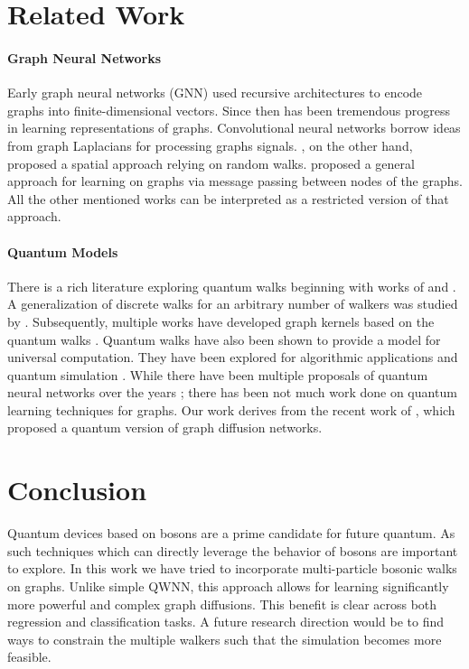 \documentclass{article}
\begin{document}
\section{Related Work}

\paragraph{Graph Neural Networks}
Early graph neural networks (GNN) \citep{gori2005new, scarselli2008graph} used recursive architectures to encode graphs into finite-dimensional vectors. Since then has been tremendous progress in learning representations of graphs. Convolutional neural networks \citep{bruna2013spectral, Defferrard2016ConvolutionalNN, Kipf2017SemiSupervisedCW} borrow ideas from graph Laplacians \citep{cvetkovic1998spectra} for processing graphs signals.  \citet{Atwood2016DiffusionConvolutionalNN}, on the other hand, proposed a spatial approach relying on random walks. \citet{gilmer2017neural} proposed a general approach for learning on graphs via message passing between nodes of the graphs. All the other mentioned works can be interpreted as a restricted version of that approach.

\paragraph{Quantum Models}
There is a rich literature exploring quantum walks beginning with works of  \citet{ambainis2001one} and \citet{aharonov2001quantum}. A generalization of discrete walks for an arbitrary number of walkers was studied by \citet{rohde2011multi}. Subsequently, multiple works have developed graph kernels based on the quantum walks \citep{rossi2013continuous, bai2013quantum, bai2017quantum}. Quantum walks have also been shown to provide a model for universal computation\cite{childs_universal}. They have been explored for algorithmic applications \cite{Childs2003QuantumAF,Qiang_2012} and quantum simulation \cite{Berr_qwsim}. While there have been multiple proposals of quantum neural networks over the years \cite{gupta2001quantum, biamonte2017quantum}; there has been not much work done on quantum learning techniques for graphs. Our work derives from the recent work of \citet{Dernbach2018QuantumWI}, which proposed a quantum version of graph diffusion networks. 



\section{Conclusion}
\label{sec:conc}
Quantum devices based on bosons are a prime candidate for future quantum. As such techniques which can directly leverage the behavior of bosons are important to explore. In this work we have tried to incorporate multi-particle bosonic walks on graphs. Unlike simple QWNN, this approach allows for learning significantly more powerful and complex graph diffusions. This benefit is clear across both regression and classification tasks. A future research direction would be to find ways to constrain the multiple walkers such that the simulation becomes more feasible.







\clearpage

\end{document}
